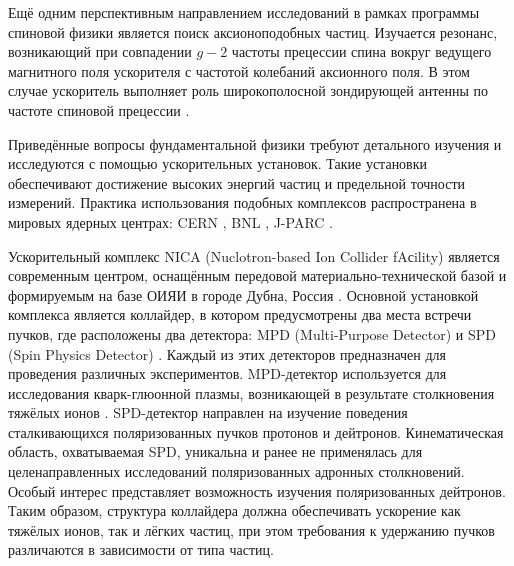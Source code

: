 \par	Ещё одним перспективным направлением исследований в рамках программы спиновой физики является поиск аксионоподобных частиц. Изучается резонанс, возникающий при совпадении $g-2$ частоты прецессии спина вокруг ведущего магнитного поля ускорителя с частотой колебаний аксионного поля. В этом случае ускоритель выполняет роль широкополосной зондирующей антенны по частоте спиновой прецессии \autocite{Axion_Nikolaev}.

\par	Приведённые вопросы фундаментальной физики требуют детального изучения и исследуются с помощью ускорительных установок. Такие установки обеспечивают достижение высоких энергий частиц и предельной точности измерений. Практика использования подобных комплексов распространена в мировых ядерных центрах: CERN \autocite{lhc:heavy_ions}, BNL \autocite{rhic:design}, J-PARC \autocite{j-park}. 

\par	Ускорительный комплекс NICA (Nuclotron-based Ion Collider fAсility) является современным центром, оснащённым передовой материально-технической базой и формируемым на базе ОИЯИ в городе Дубна, Россия \autocite{nuclotron24}. Основной установкой комплекса является коллайдер, в котором предусмотрены два места встречи пучков, где расположены два детектора: MPD (Multi-Purpose Detector) и SPD (Spin Physics Detector) \autocite{Ladygin:SPD}. Каждый из этих детекторов предназначен для проведения различных экспериментов. MPD-детектор используется для исследования кварк-глюонной плазмы, возникающей в результате столкновения тяжёлых ионов \autocite{Tech, MPD}. SPD-детектор направлен на изучение поведения сталкивающихся поляризованных пучков протонов и дейтронов. Кинематическая область, охватываемая SPD, уникальна и ранее не применялась для целенаправленных исследований поляризованных адронных столкновений. Особый интерес представляет возможность изучения поляризованных дейтронов. Таким образом, структура коллайдера должна обеспечивать ускорение как тяжёлых ионов, так и лёгких частиц, при этом требования к удержанию пучков различаются в зависимости от типа частиц.

